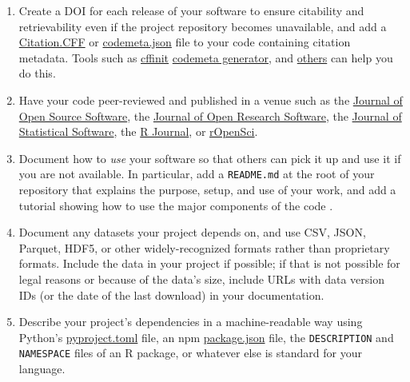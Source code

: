 \documentclass[10pt,letterpaper]{article}
\begin{document}
\begin{enumerate}

\item
  Create a DOI for each release of your software
  to ensure citability and retrievability even if the project repository becomes unavailable,
  and add a \href{https://citation-file-format.github.io/}{Citation.CFF}
  or \href{https://codemeta.github.io}{codemeta.json} file to your code \cite{Druskat2021}
  containing citation metadata.
  Tools such as \href{https://citation-file-format.github.io/cff-initializer-javascript/}{cffinit}
  \href{https://codemeta.github.io/codemeta-generator/}{codemeta generator},
  and \href{https://github.com/citation-file-format/citation-file-format/blob/main/README.md\#tools-to-work-with-citationcff-files-wrench}{others}
  can help you do this.

\item
  Have your code peer-reviewed and published in a venue such as
  the \href{https://joss.theoj.org/}{Journal of Open Source Software},
  the \href{https://openresearchsoftware.metajnl.com/}{Journal of Open Research Software},
  the \href{http://www.jstatsoft.org}{Journal of Statistical Software},
  the \href{https://journal.r-project.org/}{R Journal},
  or \href{https://ropensci.org/}{rOpenSci}.

\item
  Document how to \emph{use} your software so that others can pick it up and use it if you are not available.
  In particular,
  add a \texttt{README.md} at the root of your repository
  that explains the purpose, setup, and use of your work,
  and add a tutorial showing how to use the major components of the code
  \cite{Lee2018b,Huybrechts2024,Littauer2025,Katz2025,Turing2025}.

\item
  Document any datasets your project depends on,
  and use CSV, JSON, Parquet, HDF5, or other widely-recognized formats rather than proprietary formats.
  Include the data in your project if possible;
  if that is not possible for legal reasons or because of the data's size,
  include URLs with data version IDs (or the date of the last download) in your documentation.

\item
  Describe your project's dependencies in a machine-readable way
  using Python's \href{https://packaging.python.org/en/latest/guides/writing-pyproject-toml/}{pyproject.toml} file,
  an npm \href{https://docs.npmjs.com/cli/v10/configuring-npm/package-json?v=true}{package.json} file,
  the \texttt{DESCRIPTION} and \texttt{NAMESPACE} files of an R package,
  or whatever else is standard for your language.


\end{enumerate}
\end{document}

